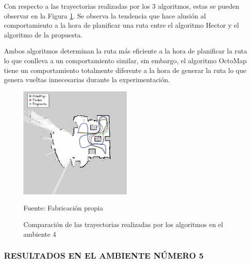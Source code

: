 Con respecto a las trayectorias realizadas por los 3 algoritmos, estas se pueden observar en la Figura \ref{fig:tray_04}. Se observa la tendencia que hace alusión al comportamiento a la hora de planificar una ruta entre el algoritmo Hector y el algoritmo de la propuesta.

Ambos algoritmos determinan la ruta más eficiente a la hora de planificar la ruta lo que conlleva a un comportamiento similar, sin embargo, el algoritmo OctoMap tiene un comportamiento totalmente diferente a la hora de generar la ruta lo que genera vueltas innecesarias durante la experimentación.

\begin{figure}[h]
    \centering
    \includegraphics[width=0.5\textwidth]{figures/05experimentacion/r03.png}
    \caption{ Comparación de las trayectorias realizadas por los algoritmos en el ambiente 4} 
    \label{fig:tray_04}
    Fuente: Fabricación propia
\end{figure}

\newpage
\subsubsection{RESULTADOS EN EL AMBIENTE NÚMERO 5}

